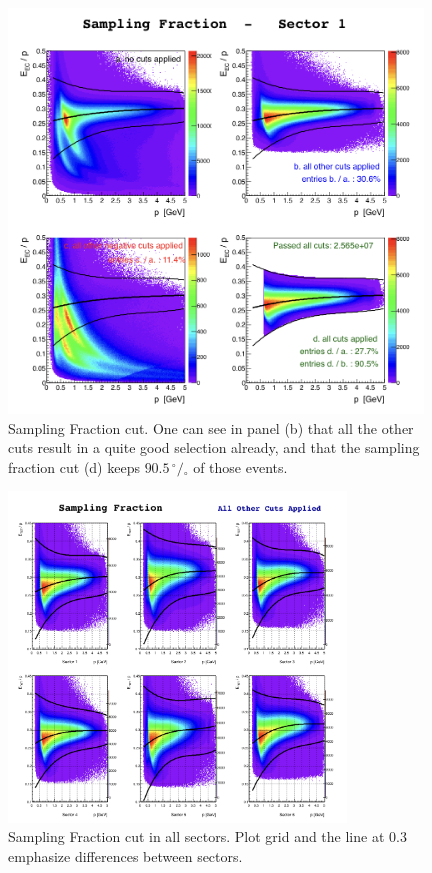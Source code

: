 \begin{figure}[ht]
  \centering
		\includegraphics[width=0.98\textwidth]{img/cut-05sampfd_sector-1.png}
		\caption{Sampling Fraction cut. One can see in panel (b) that all the other cuts 
		result in a quite good selection already, and that the sampling fraction cut (d) keeps  
		$90.5\,^{\circ\!\!}/\!_\circ$ of those events.}
 		\label{fig:sampling_fractioncut_s1}
\end{figure}

\clearpage\newpage
\begin{figure}[ht]
  \centering
		\includegraphics[width=0.8\textwidth]{img/cut-05sampf_sector-all.png}
		\caption{Sampling Fraction cut in all sectors. Plot grid and 
					the line at 0.3 emphasize differences between sectors.}
 		\label{fig:ecp_all_sectors}
\end{figure}

